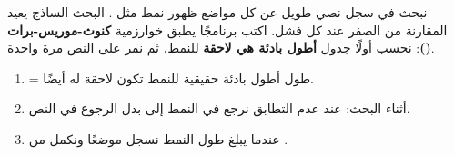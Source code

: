 \begin{statement}
نبحث في سجل نصي طويل عن كل مواضع ظهور نمط مثل . البحث الساذج يعيد المقارنة من الصفر عند كل فشل. اكتب برنامجًا يطبق خوارزمية \textbf{كنوث-موريس-برات ()}: نحسب أولًا جدول \textbf{أطول بادئة هي لاحقة}  للنمط، ثم نمر على النص مرة واحدة.
\end{statement}
\begin{stepsbox}\begin{enumerate}
\item {} = طول أطول بادئة حقيقية للنمط  تكون لاحقة له أيضًا.
\item أثناء البحث: عند عدم التطابق نرجع في النمط إلى  بدل الرجوع في النص.
\item عندما يبلغ  طول النمط نسجل موضعًا ونكمل من .
\end{enumerate}\end{stepsbox}
